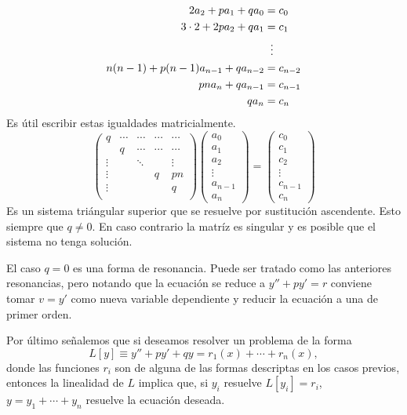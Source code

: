 \begin{enumerate}
\[
\begin{split}
2a_2+pa_1+qa_0&=c_0\\
3\cdot 2+2pa_2+qa_1&=c_1\\
 &\hspace{2mm} \vdots\\
n(n-1)+p(n-1)a_{n-1}+qa_{n-2} &=c_{n-2}\\
pna_{n}+qa_{n-1} &=c_{n-1}\\
qa_n &=c_n\\
\end{split}
\]
Es útil escribir estas igualdades matricialmente.
\[\begin{pmatrix} q &\cdots  &\cdots&\cdots&\cdots\\
&q & \cdots & \cdots&\cdots \\
\vdots & &\ddots&& \vdots\\
\vdots&&&q&pn\\
\vdots&&&&q\\
\end{pmatrix}
\begin{pmatrix}
a_0\\
a_1\\
a_2\\
\vdots\\
a_{n-1}\\
a_n
\end{pmatrix}
=
\begin{pmatrix}
c_0\\
c_1\\
c_2\\
\vdots\\
c_{n-1}\\
c_n
\end{pmatrix}
\]
Es un sistema triángular superior que se resuelve por sustitución ascendente. Esto siempre que $q\neq 0$. En caso contrario la matríz es singular y es posible que el sistema no tenga solución.

El caso $q=0$ es una forma de resonancia. Puede ser tratado como las anteriores resonancias, pero notando que la ecuación se reduce a $y''+py'=r$ conviene
tomar $v=y'$ como
nueva variable dependiente y reducir la ecuación a una de primer orden.

\end{enumerate}

Por último señalemos que si deseamos resolver un problema de la forma
\[L[y]\equiv y''+py'+qy=r_1(x)+\cdots +r_n(x),\]
donde las funciones $r_i$ son de alguna de las formas descriptas en los casos previos,
entonces la linealidad de $L$ implica que, si $y_i$
resuelve $L[y_i]=r_i$, $y=y_1+\cdots +y_n$ resuelve la ecuación deseada.


